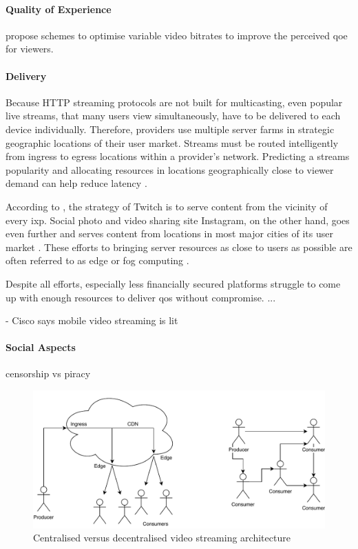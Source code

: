 \paragraph{Quality of Experience}
\citet*{personalized-live-streaming-experience} propose schemes to optimise variable video bitrates to improve the perceived \gls{qoe} for viewers.

\paragraph{Delivery}
Because HTTP streaming protocols are not built for multicasting, even popular live streams, that many users view simultaneously, have to be delivered to each device individually. Therefore, providers use multiple server farms \cite[p. 738-740]{tanenbaum_wetherall_2011} in strategic geographic locations of their user market. Streams must be routed intelligently from ingress to egress locations within a provider's network. Predicting a streams popularity and allocating resources in locations geographically close to viewer demand can help reduce latency \cite{TODO}.

According to \citet{TODO}, the strategy of Twitch is to serve content from the vicinity of every \gls{ixp}. Social photo and video sharing site Instagram, on the other hand, goes even further and serves content from locations in most major cities of its user market \cite{TODO}. These efforts to bringing server resources as close to users as possible are often referred to as edge or fog computing \cite{fog-computing, object-store-fog-edge-ipfs}.

Despite all efforts, especially less financially secured platforms struggle to come up with enough resources to deliver \gls{qos} without compromise.
...

- Cisco says mobile video streaming is lit

\paragraph{Social Aspects}
censorship vs piracy

\begin{figure}
\centering
\includegraphics[width=.5\textwidth]{graphics/streaming-types.pdf}
\caption{Centralised versus decentralised video streaming architecture}
\label{fig:de-central-architectures}
\end{figure}

